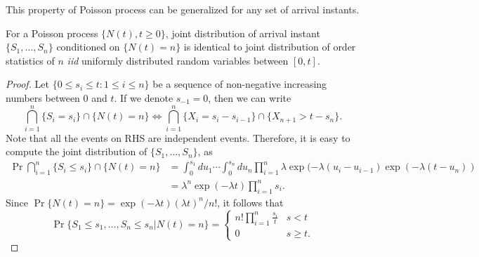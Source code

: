 \documentclass[a4paper,10pt,english]{article}
\begin{document}
This property of Poisson process can be generalized for any set of arrival instants.
\begin{prop} For a Poisson process $\{N(t), t\geqslant 0\}$, joint distribution of arrival instant $\{S_1, \ldots, S_n\}$ conditioned on $\{N(t)=n\}$ is identical to joint distribution of order statistics of $n$ \emph{iid} uniformly distributed random variables between $[0,t]$.
\end{prop}
\begin{proof} Let $\{ 0 \leq s_i \leq t: 1 \leqslant i \leqslant n\}$ be a sequence of non-negative increasing numbers between $0$ and $t$. If we denote $s_{-1} = 0$, then we can write 
\begin{equation*}
\bigcap_{i=1}^n\{S_i = s_i\}\cap\{N(t) = n\} \iff \bigcap_{i=1}^n\{X_i = s_i - s_{i-1}\}\cap\{X_{n+1} > t - s_n\}.
\end{equation*}
Note that all the events on RHS are independent events. Therefore, it is easy to compute the joint distribution of $\{S_1,\ldots, S_n\}$, as 
\begin{align*}
\Pr\bigcap_{i=1}^n\{S_i \leq s_i\}\cap\{N(t) = n\} &= \int_{0}^{s_1}du_1\cdots\int_{0}^{s_n}du_n \prod_{i=1}^n\lambda \exp(-\lambda (u_i-u_{i-1})\exp(-\lambda (t-u_n))\\
&= \lambda^n\exp(-\lambda t)\prod_{i=1}^ns_i.
\end{align*}
Since $\Pr\{N(t) = n\} = \exp(-\lambda t)(\lambda t)^n/n! $, it follows that 
\begin{equation*}
\Pr\{S_1 \leq s_1,\ldots, S_n\leq s_n | N(t) = n\} = 
\begin{cases}
n!\prod_{i=1}^n\frac{s_i}{t} & s < t\\ 
0 & s \geq t.
\end{cases}
\end{equation*}

\end{proof}
\end{document}
